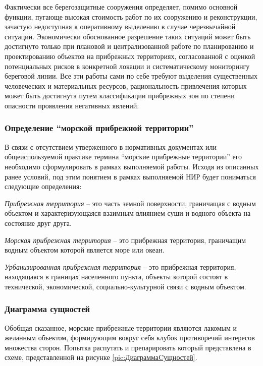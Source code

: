 Фактически все берегозащитные сооружения определяет, помимо основной функции, пугающе высокая стоимость работ по их сооружению и реконструкции, зачастую недоступная к оперативному выделению в случае черезвычайной ситуации.
Экономически обоснованное разрешение таких ситуаций может быть достигнуто только при плановой и централизованной работе по планированию и проектированию объектов на прибрежных территориях, согласованной с оценкой потенциальных рисков в конкретной локации и систематическому мониторингу береговой линии.
Все эти работы сами по себе требуют выделения существенных человеческих и материальных ресурсов, рациональность привлечения которых может быть достигнута путем классификации прибрежных зон по степени опасности проявления негативных явлений.

\subsubsection{Определение \enquote{морской прибрежной территории}}

В связи с отсутствием утверженного в нормативных документах или общеиспользуемой практике термина \enquote{морские прибрежные территории} его необходимо сформулировать в рамках выполняемой работы.
Исходя из описанных ранее условий, под этим понятием в рамках выполняемой НИР будет пониматься следующие определения:

\vspace{1em}
\textit{Прибрежная территория} -- это часть земной поверхности, граничащая с водным объектом и характеризующаяся взаимным влиянием суши и водного объекта на состояние друг друга.

\vspace{1em}
\textit{Морская прибрежная территория} -- это прибрежная территория, граничащим водным объектом которой является море или океан.

\vspace{1em}
\textit{Урбанизированная прибрежная территория} -- это прибрежная территория, находящаяся в границах населенного пункта, объекты которой состоят в технической, экономической, социально-культурной связи с водным объектом.


\subsubsection{Диаграмма сущностей}

Обобщая сказанное, морские прибрежные территории являются лакомым и желанным объектом, формирующим вокруг себя клубок противоречий интересов множества сторон.
Попытка распутать и препарировать который представлена в схеме, представленной на рисунке 
\ref{pic:ДиаграммаCущностей}.


